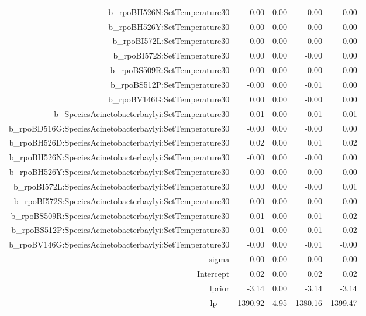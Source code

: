 \begin{table}[ht]
\begin{tabular}{rrrrr}
  b\_rpoBH526N:SetTemperature30 & -0.00 & 0.00 & -0.00 & 0.00 \\ 
  b\_rpoBH526Y:SetTemperature30 & -0.00 & 0.00 & -0.00 & 0.00 \\ 
  b\_rpoBI572L:SetTemperature30 & -0.00 & 0.00 & -0.00 & 0.00 \\ 
  b\_rpoBI572S:SetTemperature30 & 0.00 & 0.00 & -0.00 & 0.00 \\ 
  b\_rpoBS509R:SetTemperature30 & -0.00 & 0.00 & -0.00 & 0.00 \\ 
  b\_rpoBS512P:SetTemperature30 & -0.00 & 0.00 & -0.01 & 0.00 \\ 
  b\_rpoBV146G:SetTemperature30 & 0.00 & 0.00 & -0.00 & 0.00 \\ 
  b\_SpeciesAcinetobacterbaylyi:SetTemperature30 & 0.01 & 0.00 & 0.01 & 0.01 \\ 
  b\_rpoBD516G:SpeciesAcinetobacterbaylyi:SetTemperature30 & -0.00 & 0.00 & -0.00 & 0.00 \\ 
  b\_rpoBH526D:SpeciesAcinetobacterbaylyi:SetTemperature30 & 0.02 & 0.00 & 0.01 & 0.02 \\ 
  b\_rpoBH526N:SpeciesAcinetobacterbaylyi:SetTemperature30 & -0.00 & 0.00 & -0.00 & 0.00 \\ 
  b\_rpoBH526Y:SpeciesAcinetobacterbaylyi:SetTemperature30 & -0.00 & 0.00 & -0.00 & 0.00 \\ 
  b\_rpoBI572L:SpeciesAcinetobacterbaylyi:SetTemperature30 & 0.00 & 0.00 & -0.00 & 0.01 \\ 
  b\_rpoBI572S:SpeciesAcinetobacterbaylyi:SetTemperature30 & 0.00 & 0.00 & -0.00 & 0.00 \\ 
  b\_rpoBS509R:SpeciesAcinetobacterbaylyi:SetTemperature30 & 0.01 & 0.00 & 0.01 & 0.02 \\ 
  b\_rpoBS512P:SpeciesAcinetobacterbaylyi:SetTemperature30 & 0.01 & 0.00 & 0.01 & 0.02 \\ 
  b\_rpoBV146G:SpeciesAcinetobacterbaylyi:SetTemperature30 & -0.00 & 0.00 & -0.01 & -0.00 \\ 
  sigma & 0.00 & 0.00 & 0.00 & 0.00 \\ 
  Intercept & 0.02 & 0.00 & 0.02 & 0.02 \\ 
  lprior & -3.14 & 0.00 & -3.14 & -3.14 \\ 
  lp\_\_ & 1390.92 & 4.95 & 1380.16 & 1399.47 \\ 
   \hline
\end{tabular}
\end{table}
